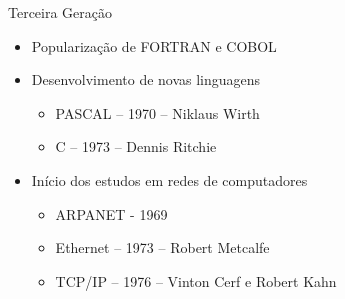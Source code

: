 \documentclass[aspectratio=169,
				xcolor=table]{beamer}
\begin{document}
	\begin{frame}{Terceira Geração}
		\begin{itemize}
			\item Popularização de FORTRAN e COBOL
			\vspace{1em}
			\item Desenvolvimento de novas linguagens
			\begin{itemize}
				\item PASCAL – 1970 – Niklaus Wirth 
				\item C – 1973 – Dennis Ritchie
			\end{itemize}
			\vspace{1em}
			\item Início dos estudos em redes de computadores
			\begin{itemize}
				\item ARPANET - 1969
				\item Ethernet – 1973 – Robert Metcalfe
				\item TCP/IP – 1976 – Vinton Cerf e Robert Kahn
			\end{itemize}

		\end{itemize}
	\end{frame}	
	
\end{document}
